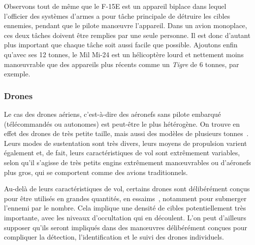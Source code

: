 	
	Observons tout de même que le F-15E est un appareil biplace dans lequel l'officier des systèmes d'armes a pour tâche principale de détruire les cibles ennemies, pendant que le pilote man\oe{}uvre l'appareil. Dans un avion monoplace, ces deux tâches doivent être remplies par une seule personne. Il est donc d'autant plus important que chaque tâche soit aussi facile que possible. Ajoutons enfin qu'avec ses 12 tonnes, le Mil Mi-24 est un hélicoptère lourd et nettement moins man\oe{}uvrable que des appareils plus récents comme un \emph{Tigre} de 6 tonnes, par exemple.
	
	\subsubsection{Drones}
	Le cas des drones aériens, c'est-à-dire des aéronefs sans pilote embarqué (télécommandés ou autonomes) est peut-être le plus hétérogène. On trouve en effet des drones de très petite taille, mais aussi des modèles de plusieurs tonnes~\footnotemark. Leurs modes de sustentation sont très divers, leurs moyens de propulsion varient également et, de fait, leurs caractéristiques de vol sont extrêmement variables, selon qu'il s'agisse de très petits engins extrêmement manœuvrables ou d'aéronefs plus gros, qui se comportent comme des avions traditionnels.

	
	Au-delà de leurs caractéristiques de vol, certains drones sont délibérément conçus pour être utilisés en grandes quantités, en essaims\footnotemark~\cite{alonso2016distributed, saska2014autonomous}, notamment pour submerger l'ennemi par le nombre. Cela implique une densité de cibles potentiellement très importante, avec les niveaux d'occultation qui en découlent. L'on peut d'ailleurs supposer qu'ils seront impliqués dans des manœuvres délibérément conçues pour compliquer la détection, l'identification et le suivi des drones individuels.
	
	
